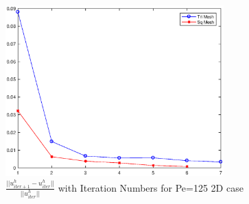 \documentclass[10pt]{article}
\begin{document}
\begin{figure}[h!]
	\begin{center}
	\includegraphics[width=0.75\textwidth, clip]{./figure/unorm.eps}
	\end{center}
		\vspace{0mm}
    \caption{$\frac{||u^{h}_{iter+1}-u^{h}_{iter}||}{||u^{h}_{iter}||}$ with Iteration Numbers for Pe=125 2D case}
  	\label{Iteration2}
\end{figure}


%


\end{document}
